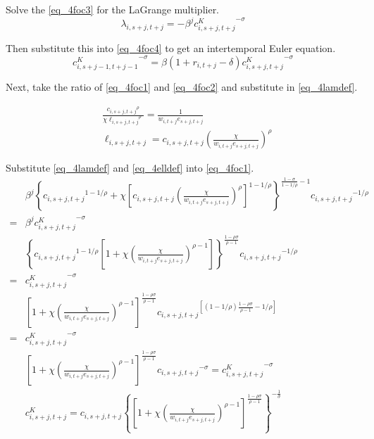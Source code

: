 \documentclass[letterpaper,12pt]{article}
\theoremstyle{definition}
\numberwithin{equation}{section}
\begin{document}
\begin{spacing}{1.5}
	Solve the \eqref{eq_4foc3} for the LaGrange multiplier.
	\begin{equation}\label{eq_4lamdef}
	       \lambda_{i,s+j,t+j} = -\beta^j {c^K_{i,s+j,t+j}}^{-\sigma}
	\end{equation}

	Then substitute this into \eqref{eq_4foc4} to get an intertemporal Euler equation.
	\begin{equation}
	       {c^K_{i,s+j-1,t+j-1}}^{-\sigma} = \beta (1+r_{i,t+j}-\delta) {c^K_{i,s+j,t+j}}^{-\sigma}
	\end{equation}

	Next, take the ratio of \eqref{eq_4foc1} and \eqref{eq_4foc2} and substitute in \eqref{eq_4lamdef}.

	\begin{align}
		& \frac{{c_{i,s+j,t+j}}^{\rho}} {\chi {\ell_{i,s+j,t+j}}^{\rho}} = \frac{1}{w_{i,t+j} e_{s+j,t+j}} \nonumber \\
		& \ell_{i,s+j,t+j} = c_{i,s+j,t+j} \left(\frac{\chi}{w_{i,t+j} e_{s+j,t+j}}\right)^\rho \label{eq_4elldef}
 	\end{align}

	Substitute \eqref{eq_4lamdef} and \eqref{eq_4elldef} into \eqref{eq_4foc1}.
	\begin{align}
		& \beta^j \left\{ {c_{i,s+j,t+j}}^{1-1/\rho} + \chi \left[c_{i,s+j,t+j} \left(\frac{\chi}{w_{i,t+j} e_{s+j,t+j}}\right)^\rho\right]^{1-1/\rho}\right\}^{\tfrac{{1-\sigma}}{1-1/\rho}-1}  {c_{i,s+j,t+j}}^{-1/\rho}  \nonumber \\ = &  \beta^j {c^K_{i,s+j,t+j}}^{-\sigma} \nonumber \\
		& \left\{ {c_{i,s+j,t+j}}^{1-1/\rho} \left[1 + \chi \left(\frac{\chi}{w_{i,t+j} e_{s+j,t+j}}\right)^{\rho-1}\right]\right\}^{\tfrac{1-\rho \sigma}{\rho-1}}  {c_{i,s+j,t+j}}^{-1/\rho}  \nonumber \\ = &   {c^K_{i,s+j,t+j}}^{-\sigma} \nonumber \\
		& \left[1 + \chi \left(\frac{\chi}{w_{i,t+j} e_{s+j,t+j}}\right)^{\rho-1}\right]^{\tfrac{1-\rho \sigma}{\rho-1}}  {c_{i,s+j,t+j}}^{\left[(1-1/\rho) \tfrac{1-\rho\sigma}{\rho-1}-1/\rho\right]}  \nonumber \\ = & {c^K_{i,s+j,t+j}}^{-\sigma} \nonumber \\
		& \left[1 + \chi \left(\frac{\chi}{w_{i,t+j} e_{s+j,t+j}}\right)^{\rho-1}\right]^{\tfrac{1-\rho \sigma}{\rho-1}}  {c_{i,s+j,t+j}}^{-\sigma} =  {c^K_{i,s+j,t+j}}^{-\sigma} \nonumber \\
		& c^K_{i,s+j,t+j} = c_{i,s+j,t+j} \left\{ \left[1 + \chi \left(\frac{\chi}{w_{i,t+j} e_{s+j,t+j}}\right)^{\rho-1}\right]^{\tfrac{1-\rho \sigma}{\rho-1}} \right\}^{-\tfrac{1}{\sigma}} \nonumber
	\end{align}


\end{spacing}
\end{document}

